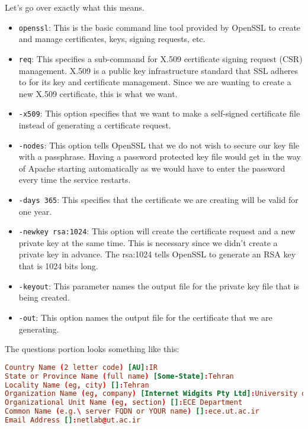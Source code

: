 \documentclass{../UTNetLab}
\begin{document}
        Let's go over exactly what this means.

        \begin{itemize}
            \item \lstinline{openssl}: This is the basic command line tool provided by OpenSSL to create and manage certificates, keys, signing requests, etc.
            \item \lstinline{req}: This specifies a sub-command for X.509 certificate signing request (CSR) management. X.509 is a public key infrastructure standard that SSL adheres to for its key and certificate management. Since we are wanting to create a new X.509 certificate, this is what we want.
            \item \lstinline{-x509}: This option specifies that we want to make a self-signed certificate file instead of generating a certificate request.
            \item \lstinline{-nodes}: This option tells OpenSSL that we do not wish to secure our key file with a passphrase. Having a password protected key file would get in the way of Apache starting automatically as we would have to enter the password every time the service restarts.
            \item \lstinline{-days 365}: This specifies that the certificate we are creating will be valid for one year.
            \item \lstinline{-newkey rsa:1024}: This option will create the certificate request and a new private key at the same time. This is necessary since we didn't create a private key in advance. The rsa:1024 tells OpenSSL to generate an RSA key that is 1024 bits long.
            \item \lstinline{-keyout}: This parameter names the output file for the private key file that is being created.
            \item \lstinline{-out}: This option names the output file for the certificate that we are generating.    
        \end{itemize}

    The questions portion looks something like this:
    {\small
    \begin{lstlisting}[language={conf},emph={IR,Tehran,University, of, ECE, Department,ece,ut,ac,ir,netlab,}]
Country Name (2 letter code) [AU]:IR 
State or Province Name (full name) [Some-State]:Tehran 
Locality Name (eg, city) []:Tehran 
Organization Name (eg, company) [Internet Widgits Pty Ltd]:University of Tehran 
Organizational Unit Name (eg, section) []:ECE Department 
Common Name (e.g.\ server FQDN or YOUR name) []:ece.ut.ac.ir 
Email Address []:netlab@ut.ac.ir 
    \end{lstlisting}}
\end{document}
